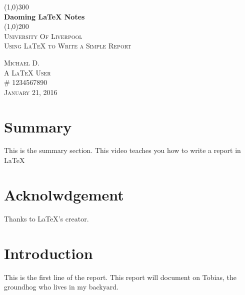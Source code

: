 \documentclass{article}
\begin{document}
\begin{titlepage}
	\begin{center} 
	\line(1,0){300}\\
	[0.25in]
	\huge {\bfseries Daoming \LaTeX{} Notes}\\
	[2mm]
	\line(1,0){200}\\
	[1.5cm]
	\textsc{\LARGE University Of Liverpool}\\
	[0.75cm]
	\textsc{\LARGE Using \LaTeX{} to Write a Simple Report}\\
	[8cm]
	\end{center}
	\begin{flushright}
	\textsc{\large Michael D. \\
	A \LaTeX{} User \\
	\# 1234567890 \\
	January 21, 2016 \\}
	\end{flushright}
\end{titlepage}

\section*{Summary}
This is the summary section. This video teaches you how to write a report in \LaTeX{}
\cleardoublepage

\section*{Acknolwdgement}
Thanks to \LaTeX{}'s creator.
\cleardoublepage

\tableofcontents
\thispagestyle{empty}
\cleardoublepage

\listoffigures
{}
\cleardoublepage

\listoftables
{}
\cleardoublepage

\setcounter{page}{1}





\section{Introduction}\label{sec:intro}
This is the first line of the report. This report will document on Tobias, the groundhog who lives in my backyard.
\end{document}
